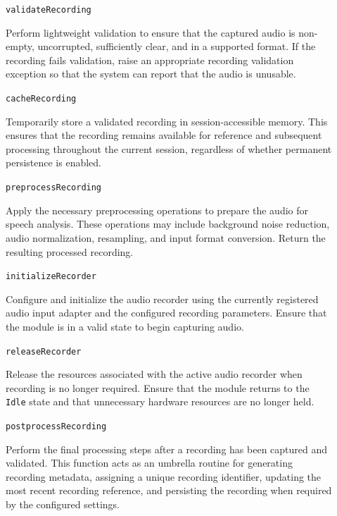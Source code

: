\documentclass[12pt, titlepage]{article}
\begin{document}
\begin{description}

\item[] \texttt{validateRecording}\par
Perform lightweight validation to ensure that the captured audio is non-empty, uncorrupted, sufficiently clear, and in a supported format. If the recording fails validation, raise an appropriate recording validation exception so that the system can report that the audio is unusable.

\item[] \texttt{cacheRecording}\par
Temporarily store a validated recording in session-accessible memory. This ensures that the recording remains available for reference and subsequent processing throughout the current session, regardless of whether permanent persistence is enabled.

\item[] \texttt{preprocessRecording}\par
Apply the necessary preprocessing operations to prepare the audio for speech analysis. These operations may include background noise reduction, audio normalization, resampling, and input format conversion. Return the resulting processed recording.

\item[] \texttt{initializeRecorder}\par
Configure and initialize the audio recorder using the currently registered audio input adapter and the configured recording parameters. Ensure that the module is in a valid state to begin capturing audio.

\item[] \texttt{releaseRecorder}\par
Release the resources associated with the active audio recorder when recording is no longer required. Ensure that the module returns to the \texttt{Idle} state and that unnecessary hardware resources are no longer held.

\item[] \texttt{postprocessRecording}\par
Perform the final processing steps after a recording has been captured and validated. This function acts as an umbrella routine for generating recording metadata, assigning a unique recording identifier, updating the most recent recording reference, and persisting the recording when required by the configured settings.

\end{description}
\end{document}
